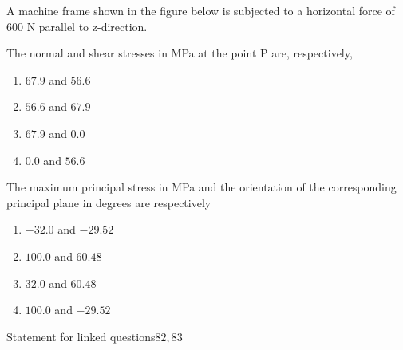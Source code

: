                         A machine frame shown in the figure below is subjected to a horizontal force of 600 N parallel to z-direction.
                       
                        \item The normal and shear stresses in MPa at the point P are, respectively,
                        \begin{enumerate}
                            \item $67.9$ and $56.6$
                            \item $56.6$ and $67.9$
                            \item $67.9$ and $0.0$
                            \item $0.0$ and $56.6$
                        \end{enumerate}
                        \item  The maximum principal stress in MPa and the orientation of the corresponding principal plane in degrees are respectively
                            \begin{enumerate}
                               \item  $-32.0$ and $-29.52 $
                               \item  $100.0$ and $60.48 $
                               \item  $32.0$ and $60.48$ 
                               \item  $100.0$ and $-29.52$
                            \end{enumerate}
                        Statement for linked questions$82 , 83$


